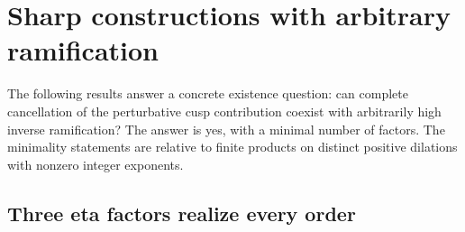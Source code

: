 \section{Sharp constructions with arbitrary ramification}
\label{sec:constructions}

The following results answer a concrete existence question:
can complete cancellation of the perturbative cusp contribution
coexist with arbitrarily high inverse ramification?
The answer is yes, with a minimal number of factors.
The minimality statements are relative to finite products on
distinct positive dilations with nonzero integer exponents.

\subsection{Three eta factors realize every order}

